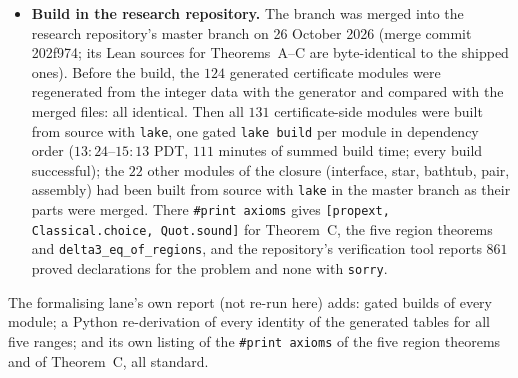 \documentclass[11pt]{amsart}
\theoremstyle{remark}
\newcommand{\lean}[1]{\texttt{#1}}
\begin{document}
\begin{itemize}
\item \textbf{Build in the research repository.} The branch was merged into the research repository's master branch on 26 October 2026 (merge commit 202f974; its Lean sources for Theorems~A--C are byte-identical to the shipped ones). Before the build, the $124$ generated certificate modules were regenerated from the integer data with the generator and compared with the merged files: all identical. Then all $131$ certificate-side modules were built from source with \texttt{lake}, one gated \texttt{lake build} per module in dependency order ($13{:}24$--$15{:}13$ PDT, $111$ minutes of summed build time; every build successful); the $22$ other modules of the closure (interface, star, bathtub, pair, assembly) had been built from source with \texttt{lake} in the master branch as their parts were merged. There \lean{\#print axioms} gives \lean{[propext, Classical.choice, Quot.sound]} for Theorem~C, the five region theorems and \lean{delta3\_eq\_of\_regions}, and the repository's verification tool reports $861$ proved declarations for the problem and none with \texttt{sorry}.
\end{itemize}
The formalising lane's own report (not re-run here) adds: gated builds of every module; a Python re-derivation of every identity of the generated tables for all five ranges; and its own listing of the \lean{\#print axioms} of the five region theorems and of Theorem~C, all standard.
\end{document}
